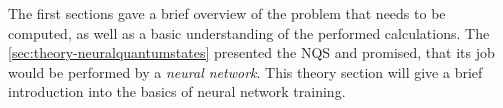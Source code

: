 The first sections gave a brief overview of the problem that needs to be computed, as well as a basic understanding of the performed calculations.
The \autoref{sec:theory-neuralquantumstates} presented the NQS and promised, that its job would be performed by a \emph{neural network}. 
This theory section will give a brief introduction into the basics of neural network training.

